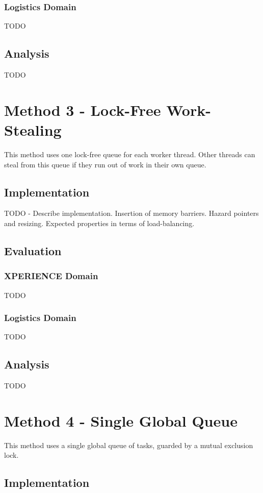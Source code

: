 \documentclass[12pt,twoside,abbrevs,msc,ai,notimes,logo,sansheadings]{infthesis}
\begin{document}
  \subsection{Logistics Domain}
  TODO
  \section{Analysis}
  TODO
  
  \chapter {Method 3 - Lock-Free Work-Stealing}
  
  This method uses one lock-free queue for each worker thread. Other threads can steal from this queue if they run out of work in their own queue.
  
  \section {Implementation}
  
  TODO - Describe implementation. Insertion of memory barriers. Hazard pointers and resizing. Expected properties in terms of load-balancing.
  
  \section{Evaluation}
  \subsection{XPERIENCE Domain}
  TODO
  \subsection{Logistics Domain}
  TODO
  \section{Analysis}
  TODO
  
  \chapter {Method 4 - Single Global Queue}
  
  This method uses a single global queue of tasks, guarded by a mutual exclusion lock.
  
  \section {Implementation}
  
\end{document}
